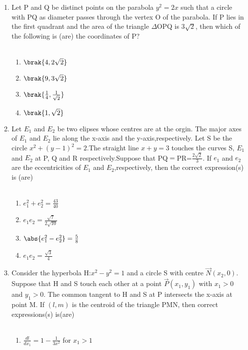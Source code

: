 \documentclass[journal,12pt,twocolumn]{IEEEtran}
\theoremstyle{remark}
\begin{document}
\begin{enumerate}
	\item Let P and Q be distinct points on the parabola $y^2=2x$ such 
		that a circle with PQ as diameter passes through the vertex
		O of the parabola. If P lies in the first quadrant and the area
		of the triangle  \(\Delta \)OPQ is 3$\sqrt{2}$, then which of the following is
		(are) the coordinates of P? \\ 
		\hfill{}
		\\
		\begin{enumerate}
			\item $ \brak{4,2\sqrt{2}}$
			\item $\brak{9,3\sqrt{2}}$
			\item $ \brak{\frac{1}{4},\frac{1}{\sqrt{2}}}$
			\item  $ \brak{1,\sqrt{2}}$
		\end{enumerate}
	\item Let $ E_1$  and $ E_2$ be two elipses whose centres are at the orgin.
              The major axes of $E_1$ and $ E_2$ lie along the x-axis and the
              y-axis,respectively. Let S be the circle $x^2+(y-1)^2=2$.The
		straight line $x+y=3$ touches the curves S, $E_1$ and $E_2$ at P, Q
		and R respectively.Suppose that PQ$=$PR=$\frac{2\sqrt{2}}{3}$. If $e_1$ and
              $e_2$ are the eccentricities of $E_1$ and $E_2$,respectively, then the 
              correct expression(s) is (are) \\
		\hfill{}
		\\
		\begin{enumerate}
			\item $e_1^2+e_2^2=\frac{43}{40}$
			\item $e_1e_2=\frac{\sqrt{7}}{2\sqrt{10}}$
			\item $\abs{ e_1^2-e_2^2}=\frac{5}{8}$
			\item $e_1e_2=\frac{\sqrt{3}}{4}$ 
		\end{enumerate}
	\item Consider the hyperbola H:$x^2-y^2=1$ and a circle S with 
		centre $\vec{N}(x_2,0)$. Suppose that H and S touch each other at a 
	      point $\vec{P}$$(x_1,y_1)$ with $x_1>0$ and $y_1>0$. The common tangent to H and S at P intersects the x-axis at point M. If ${(l,m)}$ is the centroid of the triangle PMN, then correct expressions(s) is(are) \\
	      \hfill{}
	      \\
	      \begin{enumerate}
		      \item $\frac{dl}{dx_1}=1-\frac{1}{3x^2}$ for $x_1>1$ 

\end{enumerate}$$
\end{enumerate}
\end{document}
